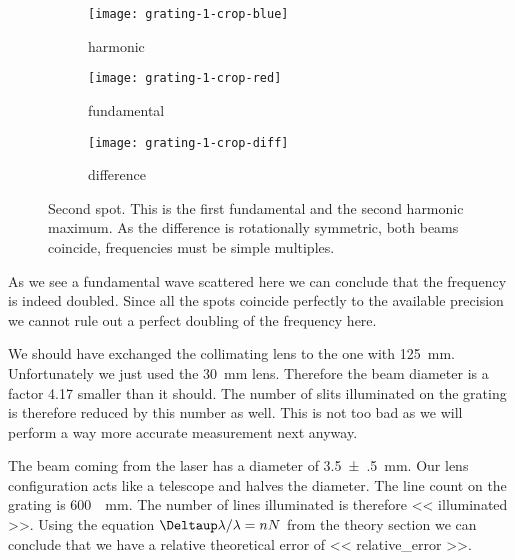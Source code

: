 \documentclass[11pt, english, fleqn, DIV=15, headinclude, BCOR=2cm]{scrreprt}
\begin{document}
\begin{figure}
    \centering
    \begin{subfigure}[c]{0.3\linewidth}
        \centering
        \texttt{[image: grating-1-crop-blue]}
        \caption{%
            harmonic
            }
    \end{subfigure}
    \hfill
    \begin{subfigure}[c]{0.3\linewidth}
        \centering
        \texttt{[image: grating-1-crop-red]}
        \caption{%
            fundamental
            }
    \end{subfigure}
    \hfill
    \begin{subfigure}[c]{0.3\linewidth}
        \centering
        \texttt{[image: grating-1-crop-diff]}
        \caption{%
            difference
            }
    \end{subfigure}
    \caption{%
        Second spot. This is the first fundamental and the second harmonic
        maximum. As the difference is rotationally symmetric, both beams
        coincide, frequencies must be simple multiples.
        }
    \label{fig:grating-1}
\end{figure}

As we see a fundamental wave scattered here we can conclude that the frequency
is indeed doubled. Since all the spots coincide perfectly to the available
precision we cannot rule out a perfect doubling of the frequency here.

We should have exchanged the collimating lens to the one with
\SI{125}{\milli\meter}. Unfortunately we just used the \SI{30}{\milli\meter}
lens. Therefore the beam diameter is a factor \num{4.17} smaller than it
should. The number of slits illuminated on the grating is therefore reduced by
this number as well. This is not too bad as we will perform a way more accurate
measurement next anyway.


The beam coming from the laser has a diameter of \SI{3.5(5)}{\milli\meter}.
Our lens configuration acts like a telescope and halves the diameter. The
line count on the grating is \SI{600}{\per\milli\meter}. The number of lines
illuminated is therefore \num{<< illuminated >>}. Using the equation $\Deltaup
\lambda / \lambda = nN$ from the theory section we can conclude that we have a
relative theoretical error of \num{<< relative_error >>}.

\end{document}
